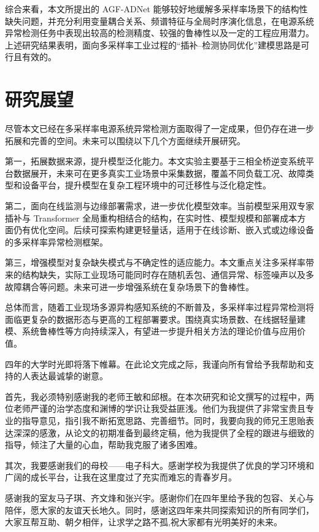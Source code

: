 \documentclass[bachelor, vlined]{DissertUESTC}
\begin{document}
        综合来看，本文所提出的 AGF-ADNet 能够较好地缓解多采样率场景下的结构性缺失问题，并充分利用变量耦合关系、频谱特征与全局时序演化信息，在电源系统异常检测任务中表现出较高的检测精度、较强的鲁棒性以及一定的工程应用潜力。上述研究结果表明，面向多采样率工业过程的“插补--检测协同优化”建模思路是可行且有效的。

        \section{研究展望}

        尽管本文已经在多采样率电源系统异常检测方面取得了一定成果，但仍存在进一步拓展和完善的空间。未来可以围绕以下几个方面继续开展研究。

        第一，拓展数据来源，提升模型泛化能力。本文实验主要基于三相全桥逆变系统平台数据展开，未来可在更多真实工业场景中采集数据，覆盖不同负载工况、故障类型和设备平台，提升模型在复杂工程环境中的可迁移性与泛化稳定性。

        第二，面向在线监测与边缘部署需求，进一步优化模型效率。当前模型采用双专家插补与 Transformer 全局重构相结合的结构，在实时性、模型规模和部署成本方面仍有优化空间。后续可探索构建更轻量话，适用于在线诊断、嵌入式或边缘设备的多采样率异常检测框架。

        第三，增强模型对复杂缺失模式与不确定性的适应能力。本文重点关注多采样率带来的结构缺失，实际工业现场可能同时存在随机丢包、通信异常、标签噪声以及多故障耦合等问题。未来可进一步增强系统在复杂场景下的鲁棒性。

        总体而言，随着工业现场多源异构感知系统的不断普及，多采样率过程异常检测将面临更复杂的数据形态与更高的工程部署要求。围绕真实场景数、在线据轻量建模、系统鲁棒性等方向持续深入，有望进一步提升相关方法的理论价值与应用价值。

		\acknowledgement

        四年的大学时光即将落下帷幕。在此论文完成之际，我谨向所有曾给予我帮助和支持的人表达最诚挚的谢意。

        首先，我必须特别感谢我的老师王敏和邱根。在本次研究和论文撰写的过程中，两位老师严谨的治学态度和渊博的学识让我受益匪浅。他们为我提供了非常宝贵且专业的指导意见，指引我不断拓宽思路、完善细节。同时，我要向我的师兄王思贻表达深深的感激，从论文的初期准备到最终定稿，他为我提供了全程的跟进与细致的指导，倾注了大量的心血，帮助我克服了诸多困难。

        其次，我要感谢我们的母校——电子科大。感谢学校为我提供了优良的学习环境和广阔的成长平台，让我在这里度过了充实而难忘的青春岁月。

        感谢我的室友马子琪、齐文烽和张兴宇。感谢你们在四年里给予我的包容、关心与陪伴，愿大家的友谊天长地久。同时，感谢这四年来共同探索知识的所有同学们，大家互帮互助、朝夕相伴，让求学之路不孤,祝大家都有光明美好的未来。
\end{document}
